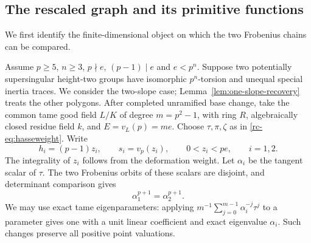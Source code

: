\subsection{The rescaled graph and its primitive functions}
We first identify the finite-dimensional object on which the two Frobenius chains can be compared.

Assume $p\ge5$, $n\ge3$, $p\nmid e$, $(p-1)\mid e$ and $e<p^n$. Suppose two potentially supersingular height-two groups have isomorphic $p^n$-torsion and unequal special inertia traces. We consider the two-slope case; Lemma~\ref{lem:one-slope-recovery} treats the other polygons. After completed unramified base change, take the common tame good field $L/K$ of degree $m=p^2-1$, with ring $R$, algebraically closed residue field $k$, and $E=v_L(p)=me$. Choose $\tau,\pi,\zeta$ as in \eqref{rc-eq:hasseweight}. Write
\[
 h_i=(p-1)z_i,\qquad s_i=v_p(z_i),\qquad 0<z_i<pe,
 \qquad i=1,2.
\]
The integrality of $z_i$ follows from the deformation weight. Let $\alpha_i$ be the tangent scalar of $\tau$. The two Frobenius orbits of these scalars are disjoint, and determinant comparison gives
\begin{equation}\label{pg-eq:determinants}
 \alpha_1^{p+1}=\alpha_2^{p+1}.
\end{equation}
We may use exact tame eigenparameters: applying $m^{-1}\sum_{j=0}^{m-1}\alpha_i^{-j}\tau^j$ to a parameter gives one with a unit linear coefficient and exact eigenvalue $\alpha_i$. Such changes preserve all positive point valuations.

